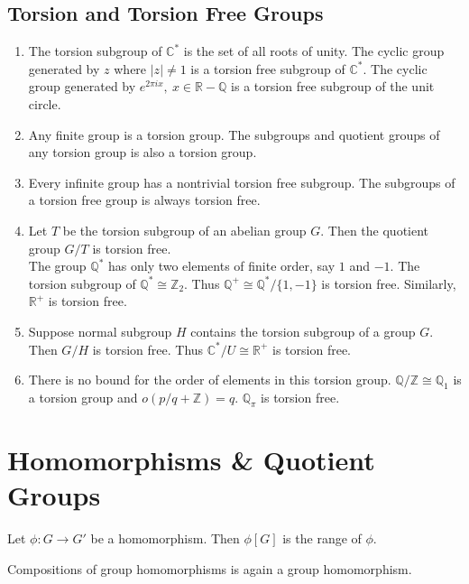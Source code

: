 \subsection{Torsion and Torsion Free Groups}
\begin{enumerate}
	\item The torsion subgroup of $\mathbb{C}^\ast$ is the set of all roots of unity.
	The cyclic group generated by $z$ where $|z| \ne 1$ is a torsion free subgroup of $\mathbb{C}^\ast$.
	The cyclic group generated by $e^{2 \pi i x},\ x \in \mathbb{R}-\mathbb{Q}$ is a torsion free subgroup of the unit circle.
	\item Any finite group is a torsion group. The subgroups and quotient groups of any torsion group is also a torsion group. 
	\item Every infinite group has a nontrivial torsion free subgroup. The subgroups of a torsion free group is always torsion free.
	\item Let $T$ be the torsion subgroup of an abelian group $G$. Then the quotient group $G/T$ is torsion free.\\

	The group $\mathbb{Q}^\ast$ has only two elements of finite order, say $1$ and $-1$.
	The torsion subgroup of $\mathbb{Q}^\ast \cong \mathbb{Z}_2$.
	Thus $\mathbb{Q}^+ \cong \mathbb{Q}^\ast / \{ 1,-1 \}$ is torsion free.
	Similarly, $\mathbb{R}^+$ is torsion free.
	\item Suppose normal subgroup $H$ contains the torsion subgroup of a group $G$. Then $G/H$ is torsion free.
	Thus $\mathbb{C}^\ast/U \cong \mathbb{R}^+$ is torsion free.
	\item There is no bound for the order of elements in this torsion group.
		\subitem $\mathbb{Q}/\mathbb{Z} \cong \mathbb{Q}_1$ is a torsion group and $o(p/q+\mathbb{Z}) = q$.
		\subitem $\mathbb{Q}_\pi$ is torsion free.
\end{enumerate}

\section{Homomorphisms \& Quotient Groups}
\begin{definition}
	Let $\phi : G \to G'$ be a homomorphism.
	Then $\phi[G]$ is the range of $\phi$.
\end{definition}
	Compositions of group homomorphisms is again a group homomorphism.

